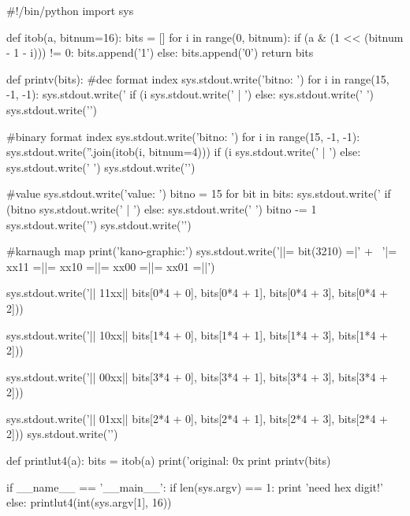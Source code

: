 \begin{pythoncode}
#!/bin/python
import sys

def itob(a, bitnum=16):
    bits = []
    for i in range(0, bitnum):
        if (a & (1 << (bitnum - 1 - i))) != 0:
            bits.append('1')
        else:
            bits.append('0')
    return bits

def printv(bits):
    #dec format index
    sys.stdout.write('bitno: ')
    for i in range(15, -1, -1):
        sys.stdout.write('%
        if (i %
            sys.stdout.write(' | ')
        else:
            sys.stdout.write(' ')
    sys.stdout.write('\n')

    #binary format index
    sys.stdout.write('bitno: ')
    for i in range(15, -1, -1):
        sys.stdout.write(''.join(itob(i, bitnum=4)))
        if (i %
            sys.stdout.write(' | ')
        else:
            sys.stdout.write(' ')
    sys.stdout.write('\n')

    #value
    sys.stdout.write('value: ')
    bitno = 15
    for bit in bits:
        sys.stdout.write('%
        if (bitno %
            sys.stdout.write(' | ')
        else:
            sys.stdout.write(' ')
        bitno -= 1
    sys.stdout.write('\n')
    sys.stdout.write('\n')

    #karnaugh map
    print('kano-graphic:')
    sys.stdout.write('||= bit(3210) =|' + \
            '|= xx11 =||= xx10 =||= xx00 =||= xx01 =||\n')
    
    sys.stdout.write('||         11xx||%
        bits[0*4 + 0], bits[0*4 + 1], bits[0*4 + 3], bits[0*4 + 2]))
    
    sys.stdout.write('||         10xx||%
        bits[1*4 + 0], bits[1*4 + 1], bits[1*4 + 3], bits[1*4 + 2]))
    
    sys.stdout.write('||         00xx||%
        bits[3*4 + 0], bits[3*4 + 1], bits[3*4 + 3], bits[3*4 + 2]))
    
    sys.stdout.write('||         01xx||%
        bits[2*4 + 0], bits[2*4 + 1], bits[2*4 + 3], bits[2*4 + 2]))
    sys.stdout.write('\n')

def printlut4(a):
    bits = itob(a)
    print('original: 0x%
    print
    printv(bits)

if __name__ == '__main__':
    if len(sys.argv) == 1:
        print 'need hex digit!'
    else:
        printlut4(int(sys.argv[1], 16))

\end{pythoncode}

